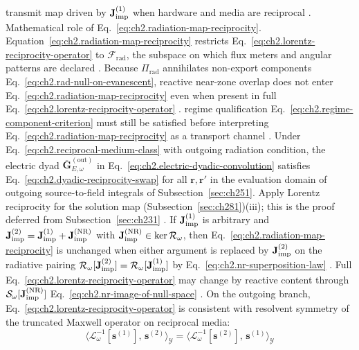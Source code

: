 transmit map driven by \(\mathbf{J}_{\mathrm{imp}}^{(1)}\) when hardware and media are reciprocal
\cite{harrington2001}.
Mathematical role of Eq.~\eqref{eq:ch2.radiation-map-reciprocity}. Equation~\eqref{eq:ch2.radiation-map-reciprocity} restricts Eq.~\eqref{eq:ch2.lorentz-reciprocity-operator}
to \(\mathcal{F}_{\mathrm{rad}}\), the subspace on which flux meters and angular patterns are
declared \cite{stratton1941}. Because \(\Pi_{\mathrm{rad}}\) annihilates
non-export components Eq.~\eqref{eq:ch2.rad-null-on-evanescent}, reactive near-zone overlap
does not enter Eq.~\eqref{eq:ch2.radiation-map-reciprocity} even when present in full
Eq.~\eqref{eq:ch2.lorentz-reciprocity-operator} \cite{stratton1941}. regime qualification
Eq.~\eqref{eq:ch2.regime-component-criterion} must still be satisfied before interpreting
Eq.~\eqref{eq:ch2.radiation-map-reciprocity} as a transport channel
\cite{harrington2001}. \label{prop:ch2.dyadic-reciprocity-home}
Under Eq.~\eqref{eq:ch2.reciprocal-medium-class} with outgoing radiation condition, the electric dyad
\(\overline{\mathbf{G}}_{E,\omega}^{\mathrm{(out)}}\) in
Eq.~\eqref{eq:ch2.electric-dyadic-convolution} satisfies
Eq.~\eqref{eq:ch2.dyadic-reciprocity-swap} for all \(\mathbf{r},\mathbf{r}'\) in the
evaluation domain of outgoing source-to-field integrals of Subsection~\ref{sec:ch251}.
Apply Lorentz reciprocity for the solution map (Subsection~\ref{sec:ch281})(iii); this is the proof deferred from
Subsection~\ref{sec:ch231} \cite{stratton1941}. \label{prop:ch2.reciprocity-null-invariance}
If \(\mathbf{J}_{\mathrm{imp}}^{(1)}\) is arbitrary and \(\mathbf{J}_{\mathrm{imp}}^{(2)}=\mathbf{J}_{\mathrm{imp}}^{(1)}+\mathbf{J}_{\mathrm{imp}}^{\mathrm{(NR)}}\) with
\(\mathbf{J}_{\mathrm{imp}}^{\mathrm{(NR)}}\in\ker\mathcal{R}_\omega\), then
Eq.~\eqref{eq:ch2.radiation-map-reciprocity} is unchanged when either argument is replaced by
\(\mathbf{J}_{\mathrm{imp}}^{(2)}\) on the radiative pairing
\(\mathcal{R}_\omega[\mathbf{J}_{\mathrm{imp}}^{(2)}]=\mathcal{R}_\omega[\mathbf{J}_{\mathrm{imp}}^{(1)}]\) by
Eq.~\eqref{eq:ch2.nr-superposition-law} \cite{stratton1941}. Full
Eq.~\eqref{eq:ch2.lorentz-reciprocity-operator} may change by reactive content through
\(\mathcal{S}_\omega[\mathbf{J}_{\mathrm{imp}}^{\mathrm{(NR)}}]\) Eq.~\eqref{eq:ch2.nr-image-of-null-space}
\cite{harrington2001}.
On the outgoing branch, Eq.~\eqref{eq:ch2.lorentz-reciprocity-operator} is consistent with
resolvent symmetry of the truncated Maxwell operator on reciprocal media:
\begin{equation}
\label{eq:ch2.resolvent-reciprocity-swap}
\langle
\mathcal{L}_\omega^{-1}[\mathbf{s}^{(1)}],\,\mathbf{s}^{(2)}
\rangle_{\mathcal{Y}}
=
\langle
\mathcal{L}_\omega^{-1}[\mathbf{s}^{(2)}],\,\mathbf{s}^{(1)}
\rangle_{\mathcal{Y}}
\end{equation}
